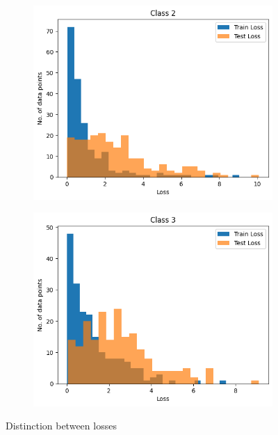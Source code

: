 \begin{figure}[h]
     \centering
     \begin{subfigure}[b]{0.49\textwidth}
         \centering
         \includegraphics[width=\textwidth]{quest2-2.png}
     \end{subfigure}
     \begin{subfigure}[b]{0.49\textwidth}
         \centering
         \includegraphics[width=\textwidth]{quest2-3.png}
     \end{subfigure}
        \caption{Distinction between losses}
        \label{fig:quest2.2}
\end{figure}

